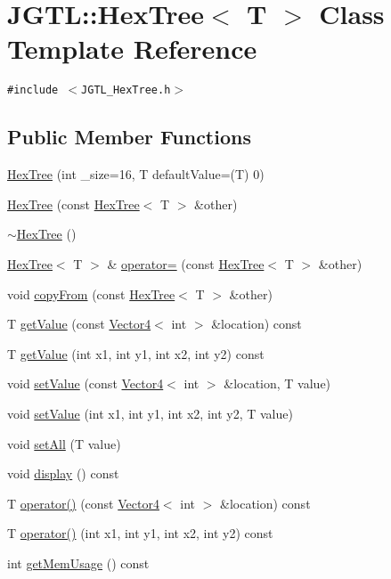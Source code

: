 \hypertarget{class_j_g_t_l_1_1_hex_tree}{
\section{JGTL::Hex\-Tree$<$ T $>$ Class Template Reference}
\label{class_j_g_t_l_1_1_hex_tree}
}
{\tt \#include $<$JGTL\_\-Hex\-Tree.h$>$}

\subsection*{Public Member Functions}
\begin{CompactItemize}
\item 
\hyperlink{class_j_g_t_l_1_1_hex_tree_0bc0009b14ba1373be655f7f8939759b}{Hex\-Tree} (int \_\-size=16, T default\-Value=(T) 0)
\item 
\hyperlink{class_j_g_t_l_1_1_hex_tree_b33bd761f532e8a9489269bbb9816cc5}{Hex\-Tree} (const \hyperlink{class_j_g_t_l_1_1_hex_tree}{Hex\-Tree}$<$ T $>$ \&other)
\item 
\hyperlink{class_j_g_t_l_1_1_hex_tree_d378b61bdb0638b99d2afd06cf90a62e}{$\sim$Hex\-Tree} ()
\item 
\hyperlink{class_j_g_t_l_1_1_hex_tree}{Hex\-Tree}$<$ T $>$ \& \hyperlink{class_j_g_t_l_1_1_hex_tree_511cd2289f7aced36c88122de0b41dbc}{operator=} (const \hyperlink{class_j_g_t_l_1_1_hex_tree}{Hex\-Tree}$<$ T $>$ \&other)
\item 
void \hyperlink{class_j_g_t_l_1_1_hex_tree_6d8486ed19b1f07ae74b85fcb6bc6969}{copy\-From} (const \hyperlink{class_j_g_t_l_1_1_hex_tree}{Hex\-Tree}$<$ T $>$ \&other)
\item 
T \hyperlink{class_j_g_t_l_1_1_hex_tree_72f9d55be8d485f8ef551d6c27aab7d7}{get\-Value} (const \hyperlink{class_j_g_t_l_1_1_vector4}{Vector4}$<$ int $>$ \&location) const
\item 
T \hyperlink{class_j_g_t_l_1_1_hex_tree_1d6ec3d8be42e25c77209fab1b350d43}{get\-Value} (int x1, int y1, int x2, int y2) const
\item 
void \hyperlink{class_j_g_t_l_1_1_hex_tree_e91ed4c6f6373541acc8dec5b82c91b4}{set\-Value} (const \hyperlink{class_j_g_t_l_1_1_vector4}{Vector4}$<$ int $>$ \&location, T value)
\item 
void \hyperlink{class_j_g_t_l_1_1_hex_tree_e39f7e05c965191d3809649ea4f7aad9}{set\-Value} (int x1, int y1, int x2, int y2, T value)
\item 
void \hyperlink{class_j_g_t_l_1_1_hex_tree_d98751804b80105248de750d25732c6d}{set\-All} (T value)
\item 
void \hyperlink{class_j_g_t_l_1_1_hex_tree_6d57b2b70e4fc6bac53e7fe193b95bdf}{display} () const
\item 
T \hyperlink{class_j_g_t_l_1_1_hex_tree_865cb6d4d3f9fd06a64e981e43d03db3}{operator()} (const \hyperlink{class_j_g_t_l_1_1_vector4}{Vector4}$<$ int $>$ \&location) const
\item 
T \hyperlink{class_j_g_t_l_1_1_hex_tree_ac1a3d36414e7db5b4681987095d10a1}{operator()} (int x1, int y1, int x2, int y2) const
\item 
int \hyperlink{class_j_g_t_l_1_1_hex_tree_e1db8278c26cac15bead7197c9e6d76c}{get\-Mem\-Usage} () const
\end{CompactItemize}
